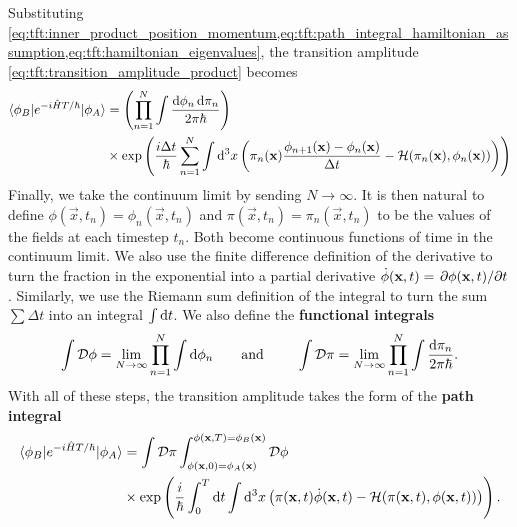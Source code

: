 Substituting \cref{eq:tft:inner_product_position_momentum,eq:tft:path_integral_hamiltonian_assumption,eq:tft:hamiltonian_eigenvalues}, the transition amplitude \eqref{eq:tft:transition_amplitude_product} becomes
\begin{equation}
\begin{split}
	\braket{\phi_B | e^{- i \hat{H} T / \hbar} | \phi_A} &=      \left( \prod_{n=1}^N \int \frac{\mathop{}\!\mathrm{d} \phi_n \mathop{}\!\mathrm{d} \pi_n}{2 \pi \hbar} \right) \\
	           &\times \exp \left( \frac{i \Delta t}{\hbar} \sum_{n=1}^N \int \mathop{}\!\mathrm{d}^3 x \left( \pi_n(\mathbf{x}) \frac{\phi_{n+1}(\mathbf{x}) - \phi_n(\mathbf{x})}{\Delta t} - \mathcal{H}(\pi_n(\mathbf{x}), \phi_n(\mathbf{x})) \right)
	\right)
\end{split}
\end{equation}
Finally, we take the continuum limit by sending $N \rightarrow \infty$.
It is then natural to define
$\phi(\vec{x}, t_n) = \phi_n(\vec{x}, t_n)$
and
$\pi(\vec{x}, t_n) = \pi_n(\vec{x}, t_n)$
to be the values of the fields at each timestep $t_n$.
Both become continuous functions of time in the continuum limit.
We also use the finite difference definition of the derivative to turn the fraction in the exponential into a partial derivative $\dot{\phi}(\mathbf{x},t) = \pdv{\phi(\mathbf{x},t)}/{t}$.
Similarly, we use the Riemann sum definition of the integral to turn the sum $\sum \Delta t$ into an integral $\int \mathop{}\!\mathrm{d} t$.
We also define the \textbf{functional integrals}
\begin{equation}
	\int \pathintdif \phi = \lim_{N \rightarrow \infty} \prod_{n=1}^{N} \int \dif \phi_n
	\qquad \text{and} \qquad
	\int \pathintdif \pi = \lim_{N \rightarrow \infty} \prod_{n=1}^{N} \int \frac{\dif \pi_n}{2 \pi \hbar} .
\end{equation}
With all of these steps, the transition amplitude takes the form of the \textbf{path integral}
\begin{equation}
\begin{split}
	\braket{\phi_B | e^{- i \hat{H} T / \hbar} | \phi_A} &=      \int \mathcal{D} \pi \int_{\phi(\mathbf{x}, 0)=\phi_A(\mathbf{x})}^{\phi(\mathbf{x},T)=\phi_B(\mathbf{x})} \mathcal{D} \phi \\
	           &\times \exp \left( \frac{i}{\hbar} \int_0^T \mathop{}\!\mathrm{d} t \int \mathop{}\!\mathrm{d}^3 x \left( \pi(\mathbf{x}, t) \dot{\phi}(\mathbf{x}, t) - \mathcal{H}(\pi(\mathbf{x}, t), \phi(\mathbf{x}, t)) \right) \right) .
\end{split}
\label{eq:tft:path_integral_hamiltonian}
\end{equation}

